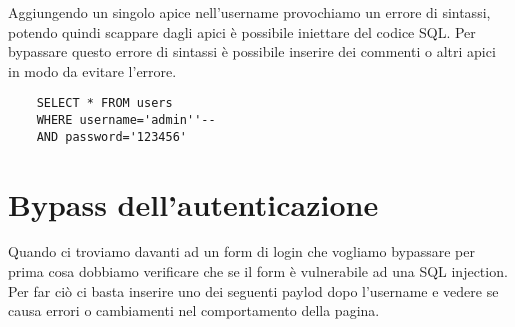 Aggiungendo un singolo apice nell'username provochiamo un errore di sintassi, potendo quindi scappare dagli apici è possibile iniettare del codice SQL. Per bypassare questo errore di sintassi è possibile inserire dei commenti o altri apici in modo da evitare l'errore.

\begin{lstlisting}
    SELECT * FROM users
    WHERE username='admin''--
    AND password='123456'
\end{lstlisting}

\section{Bypass dell'autenticazione}
Quando ci troviamo davanti ad un form di login che vogliamo bypassare per prima cosa dobbiamo verificare che se il form è vulnerabile ad una SQL injection. Per far ciò ci basta inserire uno dei seguenti paylod dopo l'username e vedere se causa errori o cambiamenti nel comportamento della pagina.

\begin{table}[h]
  \centering
  \caption{Payload per scoprire la vulnerabilità}
\end{table}

